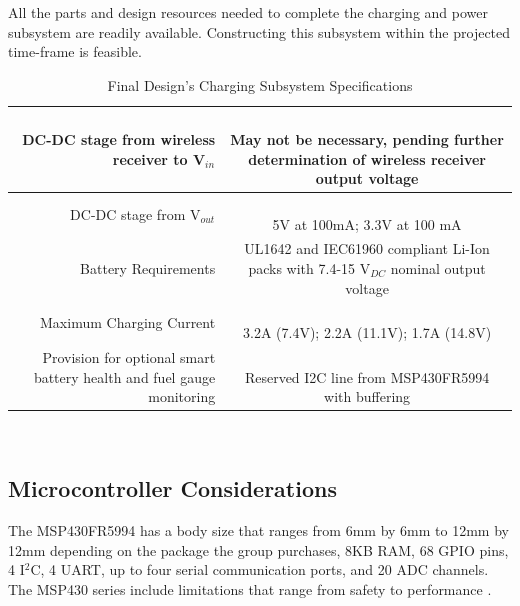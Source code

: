 \documentclass[12pt]{article}
\begin{document}
\indent
All the parts and design resources needed to complete the charging and power subsystem are readily available. Constructing this subsystem within the projected time-frame is feasible.

\begin{table}[h!]
\centering
\caption{Final Design's Charging Subsystem  Specifications}
\begin{tabular} {| r | c | }
\hline
\parbox{0.3\linewidth}{\raggedleft DC-DC stage from wireless receiver to V$_{in}$} &   \parbox{0.65\linewidth}{\hfill \\
May not be necessary, pending further determination of wireless receiver output voltage}\\
\hline
\parbox{0.3\linewidth}{\raggedleft DC-DC stage from V$_{out}$} &   \parbox{0.65\linewidth}{\hfill \\
5V at 100mA; 3.3V at 100 mA}\\
\hline
\parbox{0.3\linewidth}{\raggedleft Battery Requirements} &   \parbox{0.65\linewidth}{\hfill \\
UL1642 and IEC61960 compliant Li-Ion packs with 7.4-15 V$_{DC}$ nominal output voltage}\\
\hline
\parbox{0.3\linewidth}{\raggedleft \vspace{0.4em} Maximum Charging Current} &   \parbox{0.65\linewidth}{\hfill \\
3.2A (7.4V); 2.2A (11.1V); 1.7A (14.8V)}\\
\hline
\parbox{0.3\linewidth}{\raggedleft \vspace{0.4em} Provision for optional smart battery health and fuel gauge monitoring} &   \parbox{0.65\linewidth}{\hfill \\
Reserved I2C line from MSP430FR5994 with buffering}\\
\hline
\end{tabular}
\end{table}
\hfill \\

\subsection{Microcontroller Considerations}

\indent \indent
The MSP430FR5994 has a body size that ranges from 6mm by 6mm to 12mm by 12mm depending on the package the group purchases, 8KB RAM, 68 GPIO pins, 4 I$^2$C, 4 UART, up to four serial communication ports, and 20 ADC channels. The MSP430 series include limitations that range from safety to performance \cite{MSP430FR599x}.\\
\end{document}
